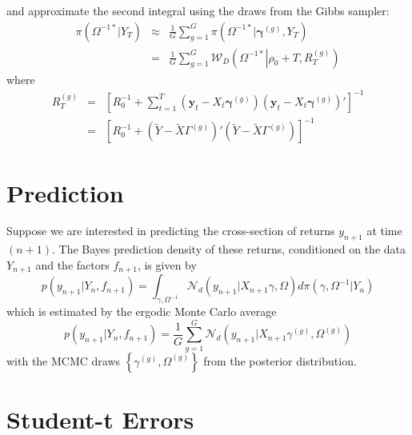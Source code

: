 \documentclass[12pt]{article}
\begin{document}
and approximate the second integral using the draws from the Gibbs sampler:
\begin{eqnarray*}
  \pi\left( \Omega^{-1*}|Y_T \right) &\approx& \frac{1}{G}\sum_{g=1}^G \pi\left( \Omega^{-1*}|\boldsymbol{\gamma}^{(g)},Y_T \right)\\
  &=& \frac{1}{G}\sum_{g=1}^G \mathcal{W}_D\left(\Omega^{-1*}\left|\rho_0 + T, R_T^{\left( g \right)}\right. \right) 
\end{eqnarray*}
where
\begin{eqnarray*}
  R_T^{(g)} &=&  \left[ R_0^{-1} + \sum_{t=1}^{T} \left( \mathbf{y}_t - X_t \boldsymbol{\gamma}^{(g)} \right)\left( \mathbf{y}_t - X_t \boldsymbol{\gamma}^{(g)} \right)' \right]^{-1}\\
  &=& \left[  R_0^{-1} + \left( \widetilde{Y} - \widetilde{X} \Gamma^{(g)} \right)'\left( \widetilde{Y} - \widetilde{X} \Gamma^{(g)} \right)\right]^{-1}
\end{eqnarray*}



\section{Prediction}

Suppose we are interested in predicting the cross-section of returns $y_{n+1}
$ at time $(n+1)$. The Bayes prediction density of these returns,
conditioned on the data $Y_{n+1}$ and the factors $f_{n+1}$, is given by%
\begin{equation*}
p(y_{n+1}|Y_{n},f_{n+1})=\int_{\gamma ,\Omega ^{-1}}\mathcal{N}_{d}\left(
y_{n+1}|X_{n+1}\gamma ,\Omega \right) d\pi \left( \gamma ,\Omega
^{-1}|Y_{n}\right)
\end{equation*}%
which is estimated by the ergodic Monte Carlo average
\begin{equation*}
p(y_{n+1}|Y_{n},f_{n+1})=\frac{1}{G}\sum_{g=1}^{G}\mathcal{N}_{d}\left(
y_{n+1}|X_{n+1}\gamma ^{(g)},\Omega ^{(g)}\right)
\end{equation*}%
with the MCMC draws $\left\{ \gamma ^{(g)},\Omega ^{(g)}\right\} $ from the
posterior distribution.


\section{Student-t Errors}
\end{document}
